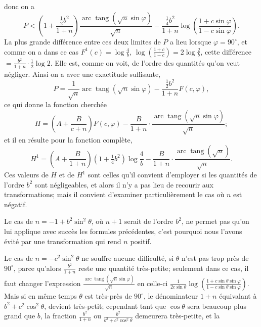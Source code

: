 \documentclass{article}
\begin{document}
donc on a
\[ P<\left(1+\frac{\tfrac{1}{2}b^{2}}{1+n}\right)\frac{\operatorname{arc}\operatorname{tang}(\sqrt{n}\sin\varphi)}{\sqrt{n}}-\frac{\tfrac{1}{4}b^{2}}{1+n}\log\left(\frac{1+c\sin\varphi}{1-c\sin\varphi}\right). \]
La plus grande différence entre ces deux limites de $P$ a lieu lorsque $\varphi=90^{\circ}$, et comme on a dans ce cas $F^{1}(c)=\log\frac{4}{b}$, $\log\left(\frac{1+c}{1-c}\right)=2\log\frac{2}{b}$, cette différence $=\frac{b^{2}}{1+n}\cdot\frac{1}{2}\log 2$. Elle est, comme on voit, de l'ordre des quantités qu'on veut négliger. Ainsi on a avec une exactitude suffisante,
\[ P=\frac{1}{\sqrt{n}}\operatorname{arc}\operatorname{tang}(\sqrt{n}\sin\varphi)-\frac{\tfrac{1}{2}b^{2}}{1+n}F(c,\varphi), \]
ce qui donne la fonction cherchée
\[ H=\left(A+\frac{B}{c+n}\right)F(c,\varphi)-\frac{B}{1+n}\cdot\frac{\operatorname{arc}\operatorname{tang}(\sqrt{n}\sin\varphi)}{\sqrt{n}}; \]
et il en résulte pour la fonction complète,
\[ H^{1}=\left(A+\frac{B}{1+n}\right)(1+\tfrac{1}{4}b^{2})\log\frac{4}{b}-\frac{B}{1+n}\cdot\frac{\operatorname{arc}\operatorname{tang}(\sqrt{n})}{\sqrt{n}}. \]
Ces valeurs de $H$ et de $H^{1}$ sont celles qu'il convient d'employer si les quantités de l'ordre $b^{2}$ sont négligeables, et alors il n'y a pas lieu de recourir aux transformations; mais il convient d'examiner particulièrement le cas où $n$ est négatif.

Le cas de $n=-1+b^{2}\sin^{2}\theta$, où $n+1$ serait de l'ordre $b^{2}$, ne permet pas qu'on lui applique avec succès les formules précédentes, c'est pourquoi nous l'avons évité par une transformation qui rend $n$ positif.

Le cas de $n=-c^{2}\sin^{2}\theta$ ne souffre aucune difficulté, si $\theta$ n'est pas trop près de $90^{\circ}$, parce qu'alors $\frac{b^{2}}{1+n}$ reste une quantité très-petite; seulement dans ce cas, il faut changer l'expression $\frac{\operatorname{arc}\operatorname{tang}(\sqrt{n}\sin\varphi)}{\sqrt{n}}$ en celle-ci $\frac{1}{2c\sin\theta}\log\left(\frac{1+c\sin\theta\sin\varphi}{1-c\sin\theta\sin\varphi}\right)$. Mais si en même temps $\theta$ est très-près de $90^{\circ}$, le dénominateur $1+n$ équivalant à $b^{2}+c^{2}\cos^{2}\theta$, devient très-petit; cependant tant que $\cos\theta$ sera beaucoup plus grand que $b$, la fraction $\frac{b^{2}}{1+n}$ ou $\frac{b^{2}}{b^{2}+c^{2}\cos^{2}\theta}$ demeurera très-petite, et la
\end{document}
